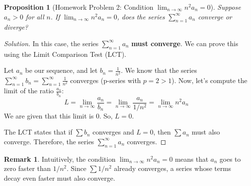 \documentclass[11pt, a4paper]{article}
\theoremstyle{plain} %
\newtheorem{proposition}[theorem]{Proposition}
\theoremstyle{definition} %
\newtheorem{remark}[theorem]{Remark}
\begin{document}
\begin{proposition}[Homework Problem 2: Condition $\lim_{n\to\infty} n^2 a_n = 0$]\label{prob:lim_n2an_zero}
Suppose $a_n > 0$ for all $n$. If $\lim_{n\to\infty} n^2 a_n = 0$, does the series $\sum_{n=1}^\infty a_n$ converge or diverge?
\end{proposition}
\begin{proof}[Solution]
In this case, the series $\sum_{n=1}^\infty a_n$ \textbf{must converge}. We can prove this using the Limit Comparison Test (LCT).

Let $a_n$ be our sequence, and let $b_n = \frac{1}{n^2}$. We know that the series $\sum_{n=1}^\infty b_n = \sum_{n=1}^\infty \frac{1}{n^2}$ converges (p-series with $p=2 > 1$).
Now, let's compute the limit of the ratio $\frac{a_n}{b_n}$:
$$ L = \lim_{n\to\infty} \frac{a_n}{b_n} = \lim_{n\to\infty} \frac{a_n}{1/n^2} = \lim_{n\to\infty} n^2 a_n $$
We are given that this limit is $0$. So, $L=0$.

The LCT states that if $\sum b_n$ converges and $L=0$, then $\sum a_n$ must also converge.
Therefore, the series $\sum_{n=1}^\infty a_n$ converges.
\end{proof}
\begin{remark}
Intuitively, the condition $\lim_{n\to\infty} n^2 a_n = 0$ means that $a_n$ goes to zero faster than $1/n^2$. Since $\sum 1/n^2$ already converges, a series whose terms decay even faster must also converge.
\end{remark}
\end{document}
